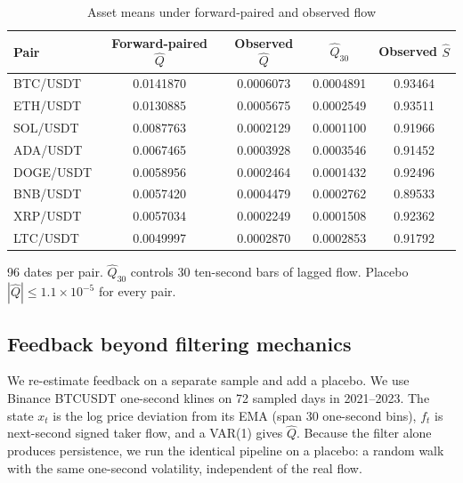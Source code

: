 \begin{table}[t]\centering\small
\begin{threeparttable}
\caption{Asset means under forward-paired and observed flow}\label{p1:tab:assets}
\begin{tabular}{lcccc}
\toprule
Pair & Forward-paired $\hat Q$ & Observed $\hat Q$ & $\hat Q_{30}$ & Observed $\hat S$\\
\midrule
BTC/USDT & 0.0141870 & 0.0006073 & 0.0004891 & 0.93464\\
ETH/USDT & 0.0130885 & 0.0005675 & 0.0002549 & 0.93511\\
SOL/USDT & 0.0087763 & 0.0002129 & 0.0001100 & 0.91966\\
ADA/USDT & 0.0067465 & 0.0003928 & 0.0003546 & 0.91452\\
DOGE/USDT & 0.0058956 & 0.0002464 & 0.0001432 & 0.92496\\
BNB/USDT & 0.0057420 & 0.0004479 & 0.0002762 & 0.89533\\
XRP/USDT & 0.0057034 & 0.0002249 & 0.0001508 & 0.92362\\
LTC/USDT & 0.0049997 & 0.0002870 & 0.0002853 & 0.91792\\
\bottomrule
\end{tabular}
\begin{tablenotes}\footnotesize\item 96 dates per pair. $\hat Q_{30}$ controls 30 ten-second bars of lagged flow. Placebo $|\hat Q|\le1.1\times10^{-5}$ for every pair. \end{tablenotes}
\end{threeparttable}
\end{table}



\subsection{Feedback beyond filtering mechanics}

We re-estimate feedback on a separate sample and add a placebo. We use Binance BTCUSDT one-second klines on 72 sampled days in 2021--2023. The state $x_t$ is the log price deviation from its EMA (span 30 one-second bins), $f_t$ is next-second signed taker flow, and a VAR(1) gives $\hat Q$. Because the filter alone produces persistence, we run the identical pipeline on a placebo: a random walk with the same one-second volatility, independent of the real flow.


